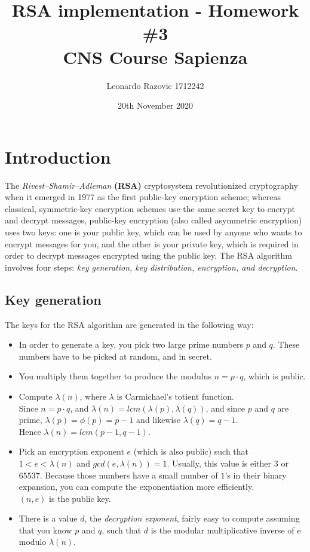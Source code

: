 \documentclass[11pt]{article}
\title{RSA implementation - Homework \#3 \\ \bigskip \large CNS Course Sapienza}
\date{20th November 2020}
\author{Leonardo Razovic 1712242}
\begin{document}
\maketitle

\section{Introduction}
The \textit{Rivest–Shamir–Adleman} \textbf{(RSA)} cryptosystem revolutionized cryptography when it
emerged in 1977 as the first public-key encryption scheme; whereas classical, symmetric-key
encryption schemes use the same secret key to encrypt and decrypt messages, public-key encryption
(also called asymmetric encryption) uses two keys: one is your public key, which can be used by
anyone who wants to encrypt messages for you, and the other is your private key, which is required
in order to decrypt messages encrypted using the public key.
The RSA algorithm involves four steps: \textit{key generation, key distribution, encryption, and decryption}.
\subsection{Key generation}
The keys for the RSA algorithm are generated in the following way:\cite{rsa-wik}
\begin{itemize}
  \item In order to generate a key, you pick two large prime numbers $p$ and $q$. These numbers have to be picked at random, and in secret.
  \item You multiply them together to produce the modulus $n = p \cdot q$, which is public.
  \item Compute $\lambda(n)$, where $\lambda$ is Carmichael's totient function.\\
        Since $n = p \cdot q$, and $\lambda(n) = lcm(\lambda(p),\lambda(q))$, and since $p$ and $q$ are prime, $\lambda(p) = \phi(p) = p - 1$ and likewise $\lambda(q) = q - 1$.\\
        Hence $\lambda(n) = lcm(p - 1, q - 1)$.
  \item Pick an encryption exponent $e$ (which is also public) such that $1 < e < \lambda(n)$ and $gcd(e, \lambda(n)) = 1$.
        Usually, this value is either $3$ or $65537$. Because those numbers have a small number of $1$'s
        in their binary expansion, you can compute the exponentiation more efficiently.\\
        $(n, e)$ is the public key.
  \item There is a value $d$, the \textit{decryption exponent}, fairly easy to compute assuming that you know $p$ and $q$, such that $d$ is the modular multiplicative inverse of e modulo $\lambda(n)$.
\end{itemize}
\end{document}
